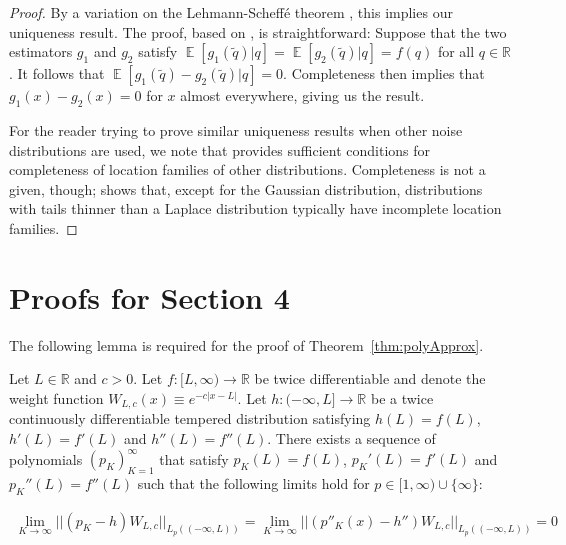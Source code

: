 \documentclass[11pt]{article}
\newcommand{\E}{\operatorname{\mathbb{E}}}
\newcommand{\R}{\mathbb{R}}
\begin{document}
\begin{proof}
By a variation on the Lehmann-Scheff\'e theorem \cite{LehmannScheffe1950}, this implies our uniqueness result. The proof, based on \cite{Mackey2015LectNotes}, is straightforward: Suppose that the two estimators $g_1$ and $g_2$ satisfy $\E[g_1(\tilde{q})|q] = \E[g_2(\tilde{q})|q] = f(q)$ for all $q \in \R$. It follows that $
    \E[g_1(\tilde{q}) - g_2(\tilde{q})|q] = 0.$
Completeness then implies that $g_1(x) - g_2(x) = 0$ for $x$ almost everywhere, giving us the result.

For the reader trying to prove similar uniqueness results when other noise distributions are used, we note that \cite{Mattner1992Complete} provides sufficient conditions for completeness of location families of other distributions. Completeness is not a given, though; \cite{Mattner1993Incomplete} shows that, except for the Gaussian distribution, distributions with tails thinner than a Laplace distribution typically have incomplete location families.
\end{proof} 


\section{Proofs for Section 4} \label{App:section4}

The following lemma is required for the proof of Theorem~\ref{thm:polyApprox}.

\begin{lemma} \label{lem:finalApproxLemma}
        Let $L \in \R$ and $c > 0$. Let $f:[L,\infty) \to \R$ be twice differentiable and denote the weight function $W_{L,c}(x) \equiv
        e^{-c|x-L|}$. Let $h:(-\infty,L] \to \R$ be a twice continuously differentiable tempered distribution satisfying $h(L) = f(L)$, $h'(L) = f'(L)$ and $h''(L) = f''(L)$. There exists a sequence of polynomials $(p_K)_{K=1}^\infty$ that satisfy $p_K(L) = f(L)$, $p_K'(L) = f'(L)$ and $p_K''(L) = f''(L)$ such that the following limits hold for $p \in [1,\infty) \cup \{\infty\}$:

        \begin{align}
        \lim_{K \to \infty} ||(p_K - h) W_{L,c}||_{L_p((-\infty,L))} = \lim_{K \to \infty}||(p''_K(x) -h'')W_{L,c}||_{L_p((-\infty,L))} = 0
        \end{align}
    \end{lemma}
\end{document}

